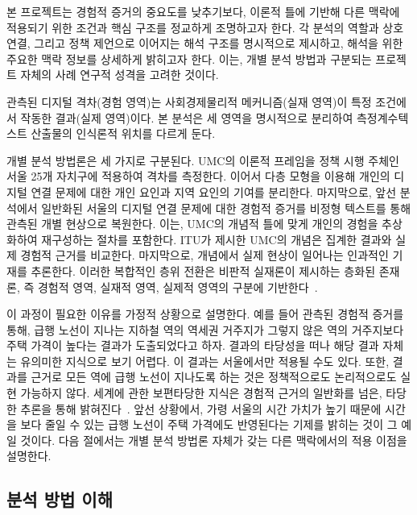 본 프로젝트는 경험적 증거의 중요도를 낮추기보다, 이론적 틀에 기반해 다른 맥락에 적용되기 위한 조건과 핵심 구조를 정교하게 조명하고자 한다. 각 분석의 역할과 상호 연결, 그리고 정책 제언으로 이어지는 해석 구조를 명시적으로 제시하고, 해석을 위한 주요한 맥락 정보를 상세하게 밝히고자 한다. 이는, 개별 분석 방법과 구분되는 프로젝트 자체의 사례 연구적 성격을 고려한 것이다.

\begin{metabox}[title=메타이론 \textperiodcentered{} 층화된 존재론 --- 경험\textperiodcentered{}실재\textperiodcentered{}실제 영역]
관측된 디지털 격차(경험 영역)는 사회\textperiodcentered{}경제\textperiodcentered{}물리적 메커니즘(실재 영역)이 특정 조건에서 작동한 결과(실제 영역)이다. 본 분석은 세 영역을 명시적으로 분리하여 측정\textperiodcentered{}계수\textperiodcentered{}텍스트 산출물의 인식론적 위치를 다르게 둔다.
\end{metabox}

개별 분석 방법론은 세 가지로 구분된다. UMC의 이론적 프레임을 정책 시행 주체인 서울 25개 자치구에 적용하여 격차를 측정한다. 이어서 다층 모형을 이용해 개인의 디지털 연결 문제에 대한 개인 요인과 지역 요인의 기여를 분리한다. 마지막으로, 앞선 분석에서 일반화된 서울의 디지털 연결 문제에 대한 경험적 증거를 비정형 텍스트를 통해 관측된 개별 현상으로 복원한다. 이는, UMC의 개념적 틀에 맞게 개인의 경험을 추상화하여 재구성하는 절차를 포함한다. ITU가 제시한 UMC의 개념은 집계한 결과와 실제 경험적 근거를 비교한다. 마지막으로, 개념에서 실제 현상이 일어나는 인과적인 기재를 추론한다. 이러한 복합적인 층위 전환은 비판적 실재론이 제시하는 층화된 존재론, 즉 경험적 영역, 실재적 영역, 실제적 영역의 구분에 기반한다~\citep{Bhaskar1975}.

이 과정이 필요한 이유를 가정적 상황으로 설명한다. 예를 들어 관측된 경험적 증거를 통해, 급행 노선이 지나는 지하철 역의 역세권 거주지가 그렇지 않은 역의 거주지보다 주택 가격이 높다는 결과가 도출되었다고 하자. 결과의 타당성을 떠나 해당 결과 자체는 유의미한 지식으로 보기 어렵다. 이 결과는 서울에서만 적용될 수도 있다. 또한, 결과를 근거로 모든 역에 급행 노선이 지나도록 하는 것은 정책적으로도 논리적으로도 실현 가능하지 않다. 세계에 관한 보편타당한 지식은 경험적 근거의 일반화를 넘은, 타당한 추론을 통해 밝혀진다~\citep{Bhaskar1975}. 앞선 상황에서, 가령 서울의 시간 가치가 높기 때문에 시간을 보다 줄일 수 있는 급행 노선이 주택 가격에도 반영된다는 기제를 밝히는 것이 그 예일 것이다. 다음 절에서는 개별 분석 방법론 자체가 갖는 다른 맥락에서의 적용 이점을 설명한다.

\subsection{분석 방법 이해}
\label{subsec:1-2}

